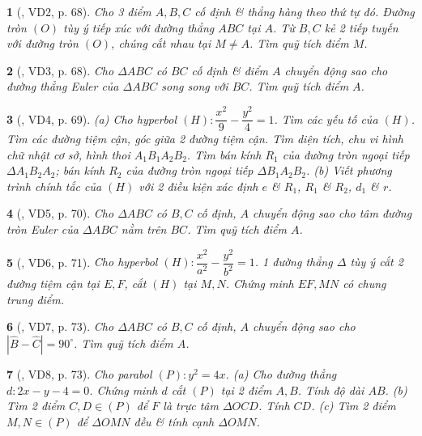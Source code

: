 \documentclass{article}
\newtheorem{baitoan}{}
\begin{document}
\begin{baitoan}[\cite{Hai_Hung_Thu_Tung_ncpt_Toan_10_tap_2}, VD2, p. 68]
	Cho 3 điểm $A,B,C$ cố định \& thẳng hàng theo thứ tự đó. Đường tròn $(O)$ tùy ý tiếp xúc với đường thẳng $ABC$ tại $A$. Từ $B,C$ kẻ 2 tiếp tuyến với đường tròn $(O)$, chúng cắt nhau tại $M\ne A$. Tìm quỹ tích điểm $M$.
\end{baitoan}

\begin{baitoan}[\cite{Hai_Hung_Thu_Tung_ncpt_Toan_10_tap_2}, VD3, p. 68]
	Cho $\Delta ABC$ có $BC$ cố định \& điểm $A$ chuyển động sao cho đường thẳng Euler của $\Delta ABC$ song song với $BC$. Tìm quỹ tích điểm $A$.
\end{baitoan}

\begin{baitoan}[\cite{Hai_Hung_Thu_Tung_ncpt_Toan_10_tap_2}, VD4, p. 69]
	(a) Cho hyperbol $(H):\dfrac{x^2}{9} - \dfrac{y^2}{4} = 1$. Tìm các yếu tố của $(H)$. Tìm các đường tiệm cận, góc giữa 2 đường tiệm cận. Tìm diện tích, chu vi hình chữ nhật cơ sở, hình thoi $A_1B_1A_2B_2$. Tìm bán kính $R_1$ của đường tròn ngoại tiếp $\Delta A_1B_2A_2$; bán kính $R_2$ của đường tròn ngoại tiếp $\Delta B_1A_2B_2$. (b) Viết phương trình chính tắc của $(H)$ với 2 điều kiện xác định $e$ \& $R_1$, $R_1$ \& $R_2$, $d_1$ \& $r$.
\end{baitoan}

\begin{baitoan}[\cite{Hai_Hung_Thu_Tung_ncpt_Toan_10_tap_2}, VD5, p. 70]
	Cho $\Delta ABC$ có $B,C$ cố định, $A$ chuyển động sao cho tâm đường tròn Euler của $\Delta ABC$ nằm trên $BC$. Tìm quỹ tích điểm $A$.
\end{baitoan}

\begin{baitoan}[\cite{Hai_Hung_Thu_Tung_ncpt_Toan_10_tap_2}, VD6, p. 71]
	Cho hyperbol $(H):\dfrac{x^2}{a^2} - \dfrac{y^2}{b^2} = 1$. 1 đường thẳng $\Delta$ tùy ý cắt 2 đường tiệm cận tại $E,F$, cắt $(H)$ tại $M,N$. Chứng minh $EF,MN$ có chung trung điểm.
\end{baitoan}

\begin{baitoan}[\cite{Hai_Hung_Thu_Tung_ncpt_Toan_10_tap_2}, VD7, p. 73]
	Cho $\Delta ABC$ có $B,C$ cố định, $A$ chuyển động sao cho $|\widehat{B} - \widehat{C}| = 90^\circ$. Tìm quỹ tích điểm $A$.
\end{baitoan}

\begin{baitoan}[\cite{Hai_Hung_Thu_Tung_ncpt_Toan_10_tap_2}, VD8, p. 73]
	Cho parabol $(P):y^2 = 4x$. (a) Cho đường thẳng $d:2x - y - 4 = 0$. Chứng minh $d$ cắt $(P)$ tại 2 điểm $A,B$. Tính độ dài $AB$. (b) Tìm 2 điểm $C,D\in(P)$ để $F$ là trực tâm $\Delta OCD$. Tính $CD$. (c) Tìm 2 điểm $M,N\in(P)$ để $\Delta OMN$ đều \& tính cạnh $\Delta OMN$.
\end{baitoan}
\end{document}

